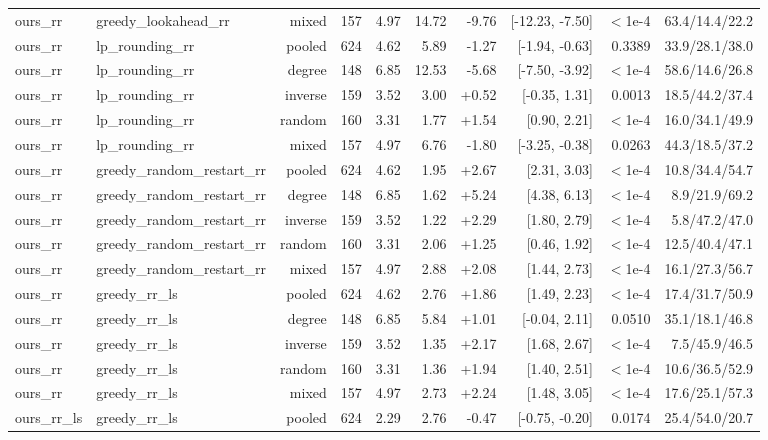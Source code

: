 \begin{table}[t]
{\begin{tabular}{llrrrrrrrr}
ours\_rr & greedy\_lookahead\_rr & mixed & 157 & 4.97 & 14.72 & -9.76 & [-12.23, -7.50] & $<$1e-4 & 63.4/14.4/22.2 \\
ours\_rr & lp\_rounding\_rr & pooled & 624 & 4.62 & 5.89 & -1.27 & [-1.94, -0.63] & 0.3389 & 33.9/28.1/38.0 \\
ours\_rr & lp\_rounding\_rr & degree & 148 & 6.85 & 12.53 & -5.68 & [-7.50, -3.92] & $<$1e-4 & 58.6/14.6/26.8 \\
ours\_rr & lp\_rounding\_rr & inverse & 159 & 3.52 & 3.00 & +0.52 & [-0.35, 1.31] & 0.0013 & 18.5/44.2/37.4 \\
ours\_rr & lp\_rounding\_rr & random & 160 & 3.31 & 1.77 & +1.54 & [0.90, 2.21] & $<$1e-4 & 16.0/34.1/49.9 \\
ours\_rr & lp\_rounding\_rr & mixed & 157 & 4.97 & 6.76 & -1.80 & [-3.25, -0.38] & 0.0263 & 44.3/18.5/37.2 \\
ours\_rr & greedy\_random\_restart\_rr & pooled & 624 & 4.62 & 1.95 & +2.67 & [2.31, 3.03] & $<$1e-4 & 10.8/34.4/54.7 \\
ours\_rr & greedy\_random\_restart\_rr & degree & 148 & 6.85 & 1.62 & +5.24 & [4.38, 6.13] & $<$1e-4 & 8.9/21.9/69.2 \\
ours\_rr & greedy\_random\_restart\_rr & inverse & 159 & 3.52 & 1.22 & +2.29 & [1.80, 2.79] & $<$1e-4 & 5.8/47.2/47.0 \\
ours\_rr & greedy\_random\_restart\_rr & random & 160 & 3.31 & 2.06 & +1.25 & [0.46, 1.92] & $<$1e-4 & 12.5/40.4/47.1 \\
ours\_rr & greedy\_random\_restart\_rr & mixed & 157 & 4.97 & 2.88 & +2.08 & [1.44, 2.73] & $<$1e-4 & 16.1/27.3/56.7 \\
ours\_rr & greedy\_rr\_ls & pooled & 624 & 4.62 & 2.76 & +1.86 & [1.49, 2.23] & $<$1e-4 & 17.4/31.7/50.9 \\
ours\_rr & greedy\_rr\_ls & degree & 148 & 6.85 & 5.84 & +1.01 & [-0.04, 2.11] & 0.0510 & 35.1/18.1/46.8 \\
ours\_rr & greedy\_rr\_ls & inverse & 159 & 3.52 & 1.35 & +2.17 & [1.68, 2.67] & $<$1e-4 & 7.5/45.9/46.5 \\
ours\_rr & greedy\_rr\_ls & random & 160 & 3.31 & 1.36 & +1.94 & [1.40, 2.51] & $<$1e-4 & 10.6/36.5/52.9 \\
ours\_rr & greedy\_rr\_ls & mixed & 157 & 4.97 & 2.73 & +2.24 & [1.48, 3.05] & $<$1e-4 & 17.6/25.1/57.3 \\
ours\_rr\_ls & greedy\_rr\_ls & pooled & 624 & 2.29 & 2.76 & -0.47 & [-0.75, -0.20] & 0.0174 & 25.4/54.0/20.7 \\

\end{tabular}}
\end{table}

